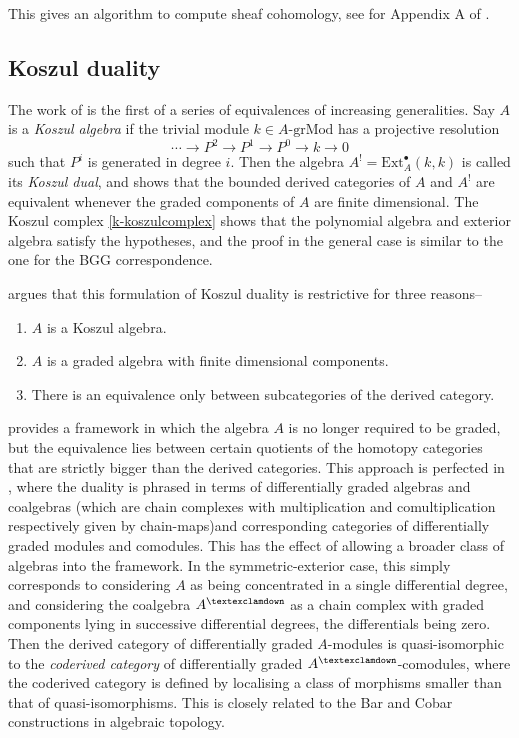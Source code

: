 \documentclass[a4paper]{article}
\theoremstyle{definition}
\theoremstyle{remark}
\newcommand{\grMod}{\ensuremath{\text{-grMod}}}
\newcommand{\gnab}{{\textexclamdown}}
\begin{document}
This gives an algorithm to compute sheaf cohomology, see for Appendix A
of .

\subsection{Koszul duality}
The work of  is the first of a series of
equivalences of increasing generalities. Say \(A\) is a \textit{Koszul algebra}
if the trivial module \(k\in A\grMod\) has a projective resolution  \[\cdots
\rightarrow P^2 \rightarrow P^1 \rightarrow P^0 \rightarrow k \rightarrow 0\]
such that \(P^i\) is generated in degree \(i\). Then the algebra
\(A^!=\text{Ext}_A^\bullet(k,k)\) is called its \textit{Koszul dual}, and
 shows that the bounded derived categories of
\(A\) and \(A^!\) are equivalent whenever the graded components of \(A\) are
finite dimensional. The Koszul complex \eqref{k-koszulcomplex}
shows that the polynomial algebra and exterior algebra satisfy the hypotheses,
and the proof in the general case is similar to the one for the BGG correspondence.

 argues that this formulation of Koszul duality
is restrictive for three reasons-- 
\begin{enumerate}
    \item \(A\) is a Koszul algebra. 
    \item \(A\) is a graded algebra with finite dimensional components.
    \item There is an equivalence only between subcategories of the
        derived category.
\end{enumerate}
 provides a framework in which the algebra
\(A\) is no longer required to be graded, but the equivalence lies between
certain quotients of the homotopy categories that are strictly bigger than the
derived categories. This approach is perfected in
, where the duality is phrased in terms of
differentially graded algebras and coalgebras (which are chain complexes with
multiplication and comultiplication respectively given by chain-maps)and
corresponding categories of differentially graded modules and comodules. This
has the effect of allowing a broader class of algebras into the framework. In
the symmetric-exterior case, this simply corresponds to considering \(A\) as
being concentrated in a single differential degree, and considering the
coalgebra \(A^\gnab\) as a chain complex with graded components lying in
successive differential degrees, the differentials being zero. Then the derived
category of differentially graded \(A\)-modules is quasi-isomorphic to the
\textit{coderived category} of differentially graded \(A^\gnab\)-comodules,
where the coderived category is defined by localising a class of morphisms
smaller than that of quasi-isomorphisms. This is closely related to the Bar and
Cobar constructions in algebraic topology.


\end{document}
